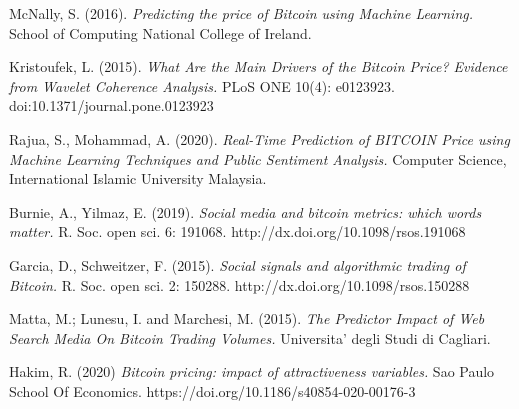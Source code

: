 \documentclass[a4paper,12pt,twocolumn]{article}
\begin{document}
\begin{thebibliography}{0000}
McNally, S. (2016).
{\em Predicting the price of Bitcoin using Machine Learning.} School of Computing National College of Ireland.

Kristoufek, L. (2015). {\em What Are the Main
Drivers of the Bitcoin Price? Evidence from Wavelet
Coherence Analysis.} PLoS ONE 10(4): e0123923.
doi:10.1371/journal.pone.0123923

Rajua, S., Mohammad, A. (2020).
{\em Real-Time Prediction of BITCOIN Price using Machine Learning Techniques and Public Sentiment Analysis.}
Computer Science, International Islamic University Malaysia.

Burnie, A., Yilmaz, E. (2019). 
{\em Social media and bitcoin metrics: which words matter.}
R. Soc. open sci. 6: 191068.
http://dx.doi.org/10.1098/rsos.191068

Garcia, D., Schweitzer, F. (2015).
{\em Social signals and algorithmic trading of Bitcoin.} R. Soc. open sci. 2: 150288.
http://dx.doi.org/10.1098/rsos.150288

Matta, M.; Lunesu, I. and Marchesi, M.  (2015).
{\em The Predictor Impact of Web Search Media On Bitcoin Trading Volumes.}
Universita’ degli Studi di Cagliari.

Hakim, R. (2020)
{\em Bitcoin pricing: impact of attractiveness variables.}
Sao Paulo School Of Economics.
https://doi.org/10.1186/s40854-020-00176-3


\end{thebibliography}
\end{document}
